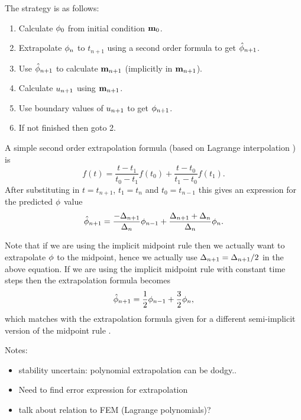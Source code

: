 The strategy is as follows:
\begin{enumerate}
\item Calculate $\phi_0$ from initial condition $\mathbf{m}_0$.
\item Extrapolate $\phi_n$ to $t_{n+1}$ using a second order formula to get $\hat{\phi}_{n+1}$.
\item Use $\hat{\phi}_{n+1}$ to calculate $\mathbf{m}_{n+1}$ (implicitly in $\mathbf{m}_{n+1}$).
\item Calculate $u_{n+1}$ using $\mathbf{m}_{n+1}$.
\item Use boundary values of $u_{n+1}$ to get $\phi_{n+1}$.
\item If not finished then goto 2.
\end{enumerate}

A simple second order extrapolation formula (based on Lagrange interpolation \cite[312]{Kincaid2002}) is 
\begin{equation}
  \label{eq:65}
  f(t) = \frac{t - t_1}{t_0 - t_1}f(t_0) + \frac{t - t_0}{t_1 - t_0}f(t_1).
\end{equation}
After substituting in $t=t_{n+1}$, $t_1=t_n$ and $t_0=t_{n-1}$ this gives an expression for the predicted $\phi$ value
\begin{equation}
  \label{eq:66}
  \hat{\phi}_{n+1} = \frac{-\Delta_{n+1}}{\Delta_{n}} \phi_{n-1} + \frac{\Delta_{n+1} + \Delta_{n}}{\Delta_{n}} \phi_n.
\end{equation}

Note that if we are using the implicit midpoint rule then we actually want to extrapolate $\phi$ to the midpoint, hence we actually use $\Delta_{n+1} = \Delta_{n+1} /2$ in the above equation.
If we are using the implicit midpoint rule with constant time steps then the extrapolation formula becomes
\begin{equation}
  \label{eq:67}
  \hat{\phi}_{n+1} = \frac{1}{2} \phi_{n-1} + \frac{3}{2} \phi_n,
\end{equation}
which matches with the extrapolation formula given for a different semi-implicit version of the midpoint rule \cite{Serpico2001}.

Notes:
\begin{itemize}
\item stability uncertain: polynomial extrapolation can be dodgy..
\item Need to find error expression for extrapolation
\item talk about relation to FEM (Lagrange polynomials)?
\end{itemize}

